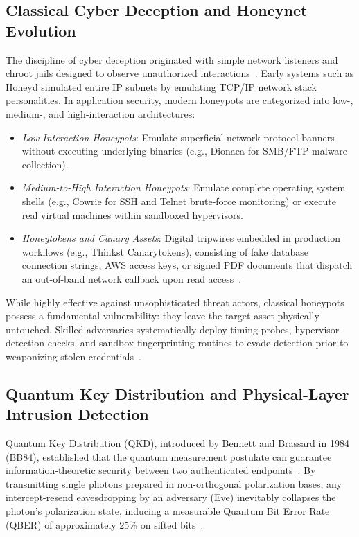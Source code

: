 \documentclass[journal,10pt]{IEEEtran}
\begin{document}
\subsection{Classical Cyber Deception and Honeynet Evolution}
The discipline of cyber deception originated with simple network listeners and chroot jails designed to observe unauthorized interactions~\cite{zhao2024adversarial}. Early systems such as Honeyd simulated entire IP subnets by emulating TCP/IP network stack personalities. In application security, modern honeypots are categorized into low-, medium-, and high-interaction architectures:
\begin{itemize}
    \item \emph{Low-Interaction Honeypots}: Emulate superficial network protocol banners without executing underlying binaries (e.g., Dionaea for SMB/FTP malware collection).
    \item \emph{Medium-to-High Interaction Honeypots}: Emulate complete operating system shells (e.g., Cowrie for SSH and Telnet brute-force monitoring) or execute real virtual machines within sandboxed hypervisors.
    \item \emph{Honeytokens and Canary Assets}: Digital tripwires embedded in production workflows (e.g., Thinkst Canarytokens), consisting of fake database connection strings, AWS access keys, or signed PDF documents that dispatch an out-of-band network callback upon read access~\cite{gupta2024canary}.
\end{itemize}
While highly effective against unsophisticated threat actors, classical honeypots possess a fundamental vulnerability: they leave the target asset physically untouched. Skilled adversaries systematically deploy timing probes, hypervisor detection checks, and sandbox fingerprinting routines to evade detection prior to weaponizing stolen credentials~\cite{alvarez2024quantum}.

\subsection{Quantum Key Distribution and Physical-Layer Intrusion Detection}
Quantum Key Distribution (QKD), introduced by Bennett and Brassard in 1984 (BB84), established that the quantum measurement postulate can guarantee information-theoretic security between two authenticated endpoints~\cite{zhang2024physical}. By transmitting single photons prepared in non-orthogonal polarization bases, any intercept-resend eavesdropping by an adversary (Eve) inevitably collapses the photon's polarization state, inducing a measurable Quantum Bit Error Rate (QBER) of approximately 25\% on sifted bits~\cite{mora2024qkd}.
\end{document}

